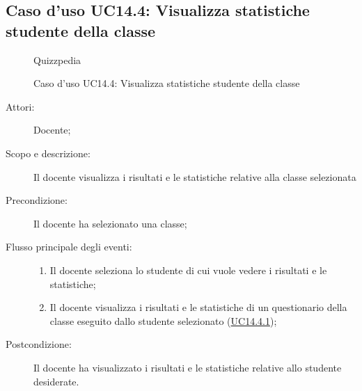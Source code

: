 \subsection{Caso d'uso UC14.4: Visualizza statistiche studente della classe}
        \begin{figure}[H]
            \centering
            \begin{resizedtikzpicture}{\textwidth}
		\begin{umlsystem}[x=0, fill=lightgray!20]{Quizzpedia}
		\end{umlsystem}
            \end{resizedtikzpicture}
            \caption{Caso d'uso UC14.4: Visualizza statistiche studente della classe}
            \label{fig:UC14.4} 
        \end{figure}
    \begin{description}
\item[Attori:] Docente;
\item[Scopo e descrizione:] Il docente visualizza i risultati e le statistiche relative alla classe selezionata
      \item[Precondizione:] Il docente ha selezionato una classe;

        \item[Flusso principale degli eventi:] \begin{enumerate}
          \item Il docente seleziona lo studente di cui vuole vedere i risultati e le statistiche;
          \item Il docente visualizza i risultati e le statistiche di un questionario della classe eseguito dallo studente selezionato (\hyperlink{UC14.4.1}{UC14.4.1});

      \end{enumerate}
    \item[Postcondizione:] Il docente ha visualizzato i risultati e le statistiche relative allo studente desiderate.
  \end{description}
\hypertarget{UC14.4.1}{}
